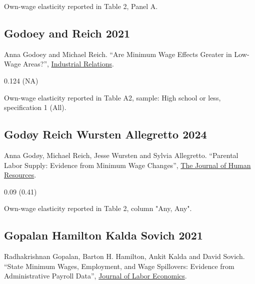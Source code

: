  Own-wage elasticity reported in Table 2, Panel A.

\subsection*{Godoey and Reich 2021}
\vspace{-0.7em}

\noindent Anna Godoey and Michael Reich. ``Are Minimum Wage Effects Greater in Low-Wage Areas?'', \href{https://doi.org/10.1111/irel.12267}{Industrial Relations}.

\vspace{0.7em}

 0.124 (NA)

\vspace{0.7em}

 Own-wage elasticity reported in Table A2, sample: High school or less, specification 1 (All).

\subsection*{Godøy Reich Wursten Allegretto 2024}
\vspace{-0.7em}

\noindent Anna Godøy, Michael Reich, Jesse Wursten and Sylvia Allegretto. ``Parental Labor Supply: Evidence from Minimum Wage Changes'', \href{https://doi.org/10.3368/jhr.1119-10540R2}{The Journal of Human Resources}.

\vspace{0.7em}

 0.09 (0.41)

\vspace{0.7em}

 Own-wage elasticity reported in Table 2, column "Any, Any".

\subsection*{Gopalan Hamilton Kalda Sovich 2021}
\vspace{-0.7em}

\noindent Radhakrishnan Gopalan, Barton H. Hamilton, Ankit Kalda and David Sovich. ``State Minimum Wages, Employment, and Wage Spillovers: Evidence from Administrative Payroll Data'', \href{https://doi.org/10.1086/711355}{Journal of Labor Economics}.

